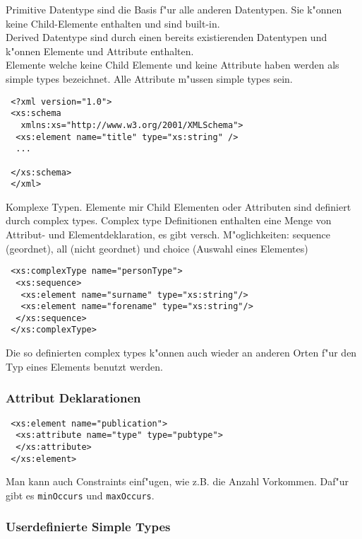 \documentclass[german, 10pt, a4paper, twocolumn]{scrartcl}
\theoremstyle{definition}
\theoremstyle{remark}
\theoremstyle{example}
\begin{document}
Primitive Datentype sind die Basis f"ur alle anderen Datentypen. Sie k"onnen keine Child-Elemente enthalten und sind built-in.\\
Derived Datentype sind durch einen bereits existierenden Datentypen und k"onnen Elemente und Attribute enthalten.\\

Elemente welche keine Child Elemente und keine Attribute haben werden als simple types bezeichnet. Alle Attribute m"ussen simple types sein.

\begin{verbatim}
 <?xml version="1.0">
 <xs:schema
   xmlns:xs="http://www.w3.org/2001/XMLSchema">
  <xs:element name="title" type="xs:string" />
  ...
 
 </xs:schema>
 </xml>
\end{verbatim}

Komplexe Typen. Elemente mir Child Elementen oder Attributen sind definiert durch complex types. Complex type Definitionen enthalten eine Menge von Attribut- und Elementdeklaration, es gibt versch. M"oglichkeiten: sequence (geordnet), all (nicht geordnet) und choice (Auswahl eines Elementes)

\begin{verbatim}
 <xs:complexType name="personType">
  <xs:sequence>
   <xs:element name="surname" type="xs:string"/>
   <xs:element name="forename" type="xs:string"/>
  </xs:sequence>
 </xs:complexType>
\end{verbatim}

Die so definierten complex types k"onnen auch wieder an anderen Orten f"ur den Typ eines Elements benutzt werden.

\subsubsection{Attribut Deklarationen}

\begin{verbatim}
 <xs:element name="publication">
  <xs:attribute name="type" type="pubtype">
  </xs:attribute>
 </xs:element>
\end{verbatim}

Man kann auch Constraints einf"ugen, wie z.B. die Anzahl Vorkommen. Daf"ur gibt es \verb#minOccurs# und \verb#maxOccurs#.

\subsubsection{Userdefinierte Simple Types}
\end{document}

